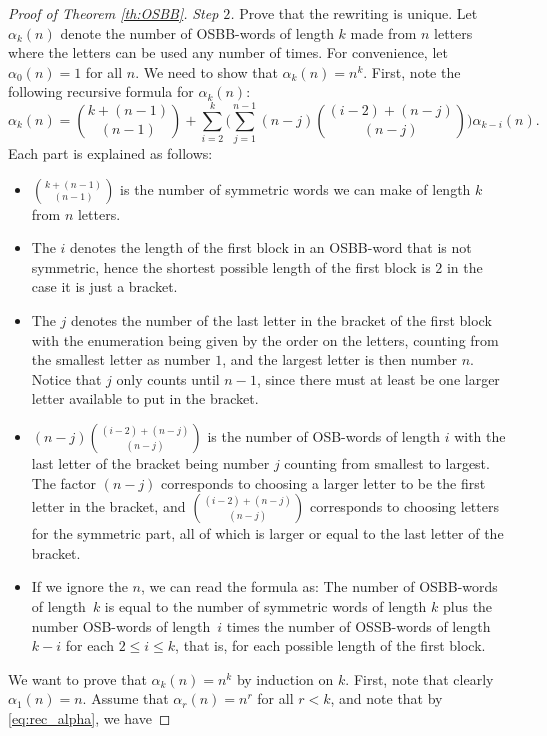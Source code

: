 \documentclass[10pt,a4paper]{amsart}
\numberwithin{equation}{section}
\begin{document}
\begin{proof}[Proof of Theorem \ref{th:OSBB}]
 \textit{Step $2$.} Prove that the rewriting is unique. Let $\alpha_k(n)$ denote the number of OSBB-words of length $k$ made from $n$ letters where the letters can be used any number of times. For convenience, let $\alpha_0(n)=1$ for all $n$. We need to show that $\alpha_k(n) = n^k$. First, note the following recursive formula for $\alpha_k(n)$:
 \begin{equation}\label{eq:rec_alpha}
 \alpha_k(n) = \binom{k + (n-1)}{(n-1)} + \sum_{i=2}^k \Biggl( \sum_{j=1}^{n-1} (n-j) \binom{(i-2) + (n-j)}{(n-j)} \Biggr) \alpha_{k-i}(n).
 \end{equation}
 Each part is explained as follows:
 \begin{itemize}\itemsep=0pt
 \item $\binom{k + (n-1)}{(n-1)}$ is the number of symmetric words we can make of length $k$ from $n$ letters.
 \item The $i$ denotes the length of the first block in an OSBB-word that is not symmetric, hence the shortest possible length of the first block is $2$ in the case it is just a bracket.
 \item The $j$ denotes the number of the last letter in the bracket of the first block with the enumeration being given by the order on the letters, counting from the smallest letter as number $1$, and the largest letter is then number $n$. Notice that $j$ only counts until $n-1$, since there must at least be one larger letter available to put in the bracket.
 \item $(n-j) \binom{(i-2) + (n-j)}{(n-j)}$ is the number of OSB-words of length $i$ with the last letter of the bracket being number $j$ counting from smallest to largest. The factor $(n-j)$ corresponds to choosing a larger letter to be the first letter in the bracket, and $\binom{(i-2) + (n-j)}{(n-j)}$ corresponds to choosing letters for the symmetric part, all of which is larger or equal to the last letter of the bracket.
 \item If we ignore the $n$, we can read the formula as: The number of OSBB-words of length~$k$ is equal to the number of symmetric words of length $k$ plus the number OSB-words of length~$i$ times the number of OSSB-words of length $k-i$ for each $2\leq i \leq k$, that is, for each possible length of the first block.
 \end{itemize}
 We want to prove that $\alpha_k(n)=n^k$ by induction on $k$. First, note that clearly $\alpha_1(n) = n$. Assume that $\alpha_r(n)=n^r$ for all $r<k$, and note that by \eqref{eq:rec_alpha}, we have

\end{proof}
\end{document}
